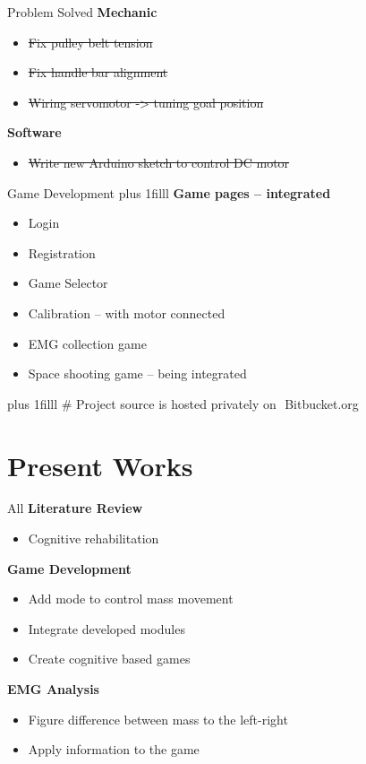\documentclass[10pt]{beamer}
\newcommand{\vfillall}{\vskip0pt plus 1filll}
\begin{document}
\begin{frame}{Problem Solved}
	\large \textbf{Mechanic}
	\normalsize
	\begin{itemize}
		\item \sout{Fix pulley belt tension}
		\item \sout{Fix handle bar alignment}
		\item \sout{Wiring servomotor -> tuning goal position}
	\end{itemize}
	
	\large \textbf{Software}
	\normalsize
	\begin{itemize}
		\item \sout{Write new Arduino sketch to control DC motor}
	\end{itemize}
\end{frame}

\begin{frame}{Game Development}
	\vfillall
	\large \textbf{Game pages – integrated}
	\begin{itemize}
		\item Login
		\item Registration
		\item Game Selector
		\item Calibration – with motor connected
		\item EMG collection game 
		\item Space shooting game – \alert{being integrated}
	\end{itemize}
	\vfillall
	\centering \footnotesize \# Project source is hosted privately on \,{\color{blue!52!cyan}\faBitbucket \,Bitbucket.org}
	\smallskip
\end{frame}

\section{Present Works}
	\begin{frame}{All}
		\large \textbf{Literature Review}
		\normalsize
		\begin{itemize}
			\item Cognitive rehabilitation
		\end{itemize}
		\large \textbf{Game Development}
		\normalsize
		\begin{itemize}
			\item Add mode to control mass movement
			\item Integrate developed modules
			\item Create cognitive based games
		\end{itemize}
		\large \textbf{EMG Analysis}
		\normalsize
		\begin{itemize}
			\item Figure difference between mass to the left-right
			\item Apply information to the game
		\end{itemize}
	\end{frame}
	
\end{document}
